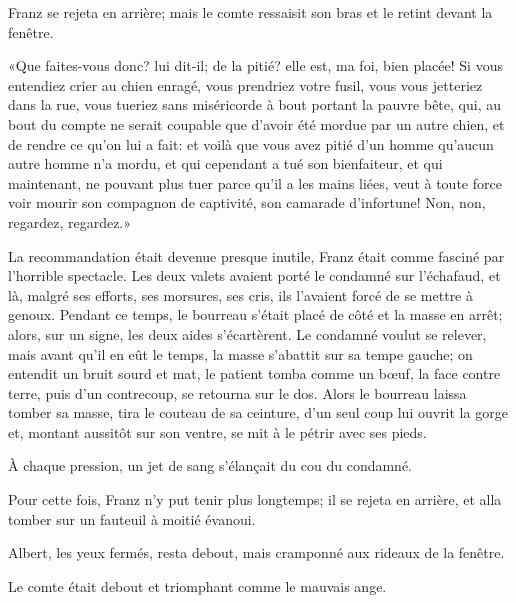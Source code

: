 Franz se rejeta en arrière; mais le comte ressaisit son bras et le retint devant la fenêtre. 

«Que faites-vous donc? lui dit-il; de la pitié? elle est, ma foi, bien placée! Si vous entendiez crier au chien enragé, vous prendriez votre fusil, vous vous jetteriez dans la rue, vous tueriez sans miséricorde à bout portant la pauvre bête, qui, au bout du compte ne serait coupable que d'avoir été mordue par un autre chien, et de rendre ce qu'on lui a fait: et voilà que vous avez pitié d'un homme qu'aucun autre homme n'a mordu, et qui cependant a tué son bienfaiteur, et qui maintenant, ne pouvant plus tuer parce qu'il a les mains liées, veut à toute force voir mourir son compagnon de captivité, son camarade d'infortune! Non, non, regardez, regardez.» 

La recommandation était devenue presque inutile, Franz était comme fasciné par l'horrible spectacle. Les deux valets avaient porté le condamné sur l'échafaud, et là, malgré ses efforts, ses morsures, ses cris, ils l'avaient forcé de se mettre à genoux. Pendant ce temps, le bourreau s'était placé de côté et la masse en arrêt; alors, sur un signe, les deux aides s'écartèrent. Le condamné voulut se relever, mais avant qu'il en eût le temps, la masse s'abattit sur sa tempe gauche; on entendit un bruit sourd et mat, le patient tomba comme un bœuf, la face contre terre, puis d'un contrecoup, se retourna sur le dos. Alors le bourreau laissa tomber sa masse, tira le couteau de sa ceinture, d'un seul coup lui ouvrit la gorge et, montant aussitôt sur son ventre, se mit à le pétrir avec ses pieds. 

À chaque pression, un jet de sang s'élançait du cou du condamné.  

Pour cette fois, Franz n'y put tenir plus longtemps; il se rejeta en arrière, et alla tomber sur un fauteuil à moitié évanoui. 

Albert, les yeux fermés, resta debout, mais cramponné aux rideaux de la fenêtre. 

Le comte était debout et triomphant comme le mauvais ange. 